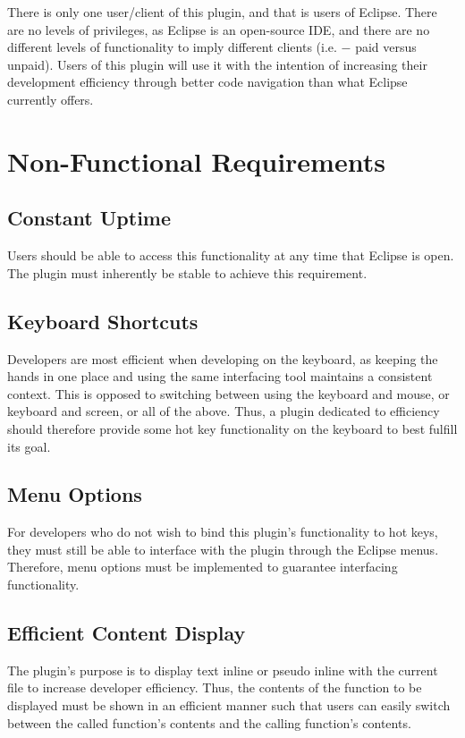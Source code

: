\documentclass[]{report}
\begin{document}
There is only one user/client of this plugin, and that is users of Eclipse.  There are no levels of privileges, as Eclipse is an open-source IDE, and there are no different levels of functionality to imply different clients (i.e. $-$ paid versus unpaid). Users of this plugin will use it with the intention of increasing their development efficiency through better code navigation than what Eclipse currently offers.

\chapter{Non-Functional Requirements}

\section{Constant Uptime}

Users should be able to access this functionality at any time that Eclipse is open.  The plugin must inherently be stable to achieve this requirement.

\section{Keyboard Shortcuts}

Developers are most efficient when developing on the keyboard, as keeping the hands in one place and using the same interfacing tool maintains a consistent context.  This is opposed to switching between using the keyboard and mouse, or keyboard and screen, or all of the above.  Thus, a plugin dedicated to efficiency should therefore provide some hot key functionality on the keyboard to best fulfill its goal.

\section{Menu Options}

For developers who do not wish to bind this plugin's functionality to hot keys, they must still be able to interface with the plugin through the Eclipse menus.  Therefore, menu options must be implemented to guarantee interfacing functionality.

\section{Efficient Content Display}

The plugin's purpose is to display text inline or pseudo inline with the current file to increase developer efficiency.  Thus, the contents of the function to be displayed must be shown in an efficient manner such that users can easily switch between the called function's contents and the calling function's contents.
\end{document}
